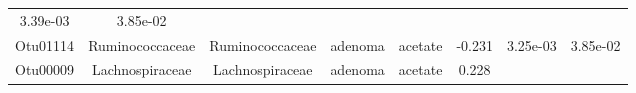 \documentclass[11pt,]{article}
\begin{document}
\begin{longtable}[]{@{}cccccccc@{}}
\begin{minipage}[t]{0.08\columnwidth}
3.39e-03\strut
\end{minipage} & \begin{minipage}[t]{0.08\columnwidth}\centering\strut
3.85e-02\strut
\end{minipage}\tabularnewline
\begin{minipage}[t]{0.08\columnwidth}\centering\strut
Otu01114\strut
\end{minipage} & \begin{minipage}[t]{0.15\columnwidth}\centering\strut
Ruminococcaceae\strut
\end{minipage} & \begin{minipage}[t]{0.15\columnwidth}\centering\strut
Ruminococcaceae\strut
\end{minipage} & \begin{minipage}[t]{0.08\columnwidth}\centering\strut
adenoma\strut
\end{minipage} & \begin{minipage}[t]{0.09\columnwidth}\centering\strut
acetate\strut
\end{minipage} & \begin{minipage}[t]{0.07\columnwidth}\centering\strut
-0.231\strut
\end{minipage} & \begin{minipage}[t]{0.08\columnwidth}\centering\strut
3.25e-03\strut
\end{minipage} & \begin{minipage}[t]{0.08\columnwidth}\centering\strut
3.85e-02\strut
\end{minipage}\tabularnewline
\begin{minipage}[t]{0.08\columnwidth}\centering\strut
Otu00009\strut
\end{minipage} & \begin{minipage}[t]{0.15\columnwidth}\centering\strut
Lachnospiraceae\strut
\end{minipage} & \begin{minipage}[t]{0.15\columnwidth}\centering\strut
Lachnospiraceae\strut
\end{minipage} & \begin{minipage}[t]{0.08\columnwidth}\centering\strut
adenoma\strut
\end{minipage} & \begin{minipage}[t]{0.09\columnwidth}\centering\strut
acetate\strut
\end{minipage} & \begin{minipage}[t]{0.07\columnwidth}\centering\strut
0.228\strut
\end{minipage} & \begin{minipage}[t]{0.08\columnwidth}\centering\strut

\end{minipage}
\end{longtable}
\end{document}

